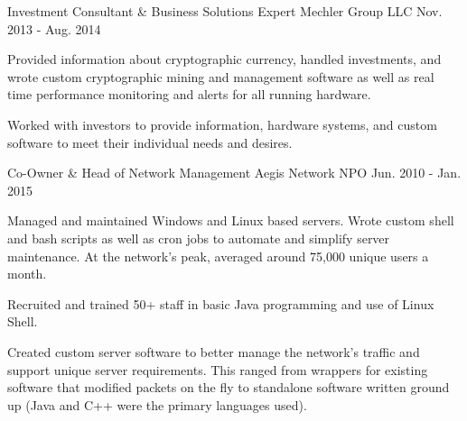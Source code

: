 \begin{cventries}
    \cventry
      {Investment Consultant \& Business Solutions Expert} %
      {Mechler Group LLC} %
      {} %
      {Nov. 2013 - Aug. 2014} %
      {
        \begin{cvitems} %
          \item {Provided information about cryptographic currency, handled %
          investments, and wrote custom cryptographic mining and management software %
          as well as real time performance monitoring and alerts for all running %
          hardware.}
          \item {Worked with investors to provide information, %
          hardware systems, and custom software to meet their individual needs %
          and desires.}
        \end{cvitems}
      }

  \cventry
    {Co-Owner \& Head of Network Management} %
    {Aegis Network NPO} %
    {} %
    {Jun. 2010 - Jan. 2015} %
    {
      \begin{cvitems} %
        \item {Managed and maintained Windows and Linux based servers. %
        Wrote custom shell and bash scripts as well as cron jobs to automate %
        and simplify server maintenance. At the network's peak, averaged around %
        75,000 unique users a month.}
        \item {Recruited and trained 50+ staff in basic Java programming and %
        use of Linux Shell.}
        \item {Created custom server software to better manage the network's %
        traffic and support unique server requirements. This ranged from %
        wrappers for existing software that modified packets on the fly to %
        standalone software written ground up (Java and C++ were the primary %
        languages used).}
      \end{cvitems}
    }

\end{cventries}
